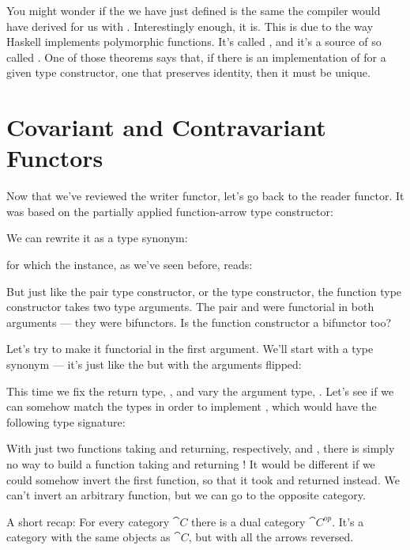 You might wonder if the  we have just defined is the same
 the compiler would have derived for us with
. Interestingly enough, it is. This is due to
the way Haskell implements polymorphic functions. It's called
, and it's a source of so called
. One of those theorems says that, if there is
an implementation of  for a given type constructor, one
that preserves identity, then it must be unique.

\section{Covariant and Contravariant Functors}

Now that we've reviewed the writer functor, let's go back to the reader
functor. It was based on the partially applied function-arrow type
constructor:

We can rewrite it as a type synonym:

for which the  instance, as we've seen before, reads:

But just like the pair type constructor, or the  type
constructor, the function type constructor takes two type arguments. The
pair and  were functorial in both arguments --- they were
bifunctors. Is the function constructor a bifunctor too?

Let's try to make it functorial in the first argument. We'll start with
a type synonym --- it's just like the  but with the
arguments flipped:

This time we fix the return type, , and vary the argument
type, . Let's see if we can somehow match the types in order
to implement , which would have the following type
signature:

With just two functions taking  and returning, respectively,
 and , there is simply no way to build a function
taking  and returning ! It would be different if we
could somehow invert the first function, so that it took  and
returned  instead. We can't invert an arbitrary function, but
we can go to the opposite category.

A short recap: For every category $\cat{C}$ there is a dual category
$\cat{C}^{op}$. It's a category with the same objects as
$\cat{C}$, but with all the arrows reversed.

